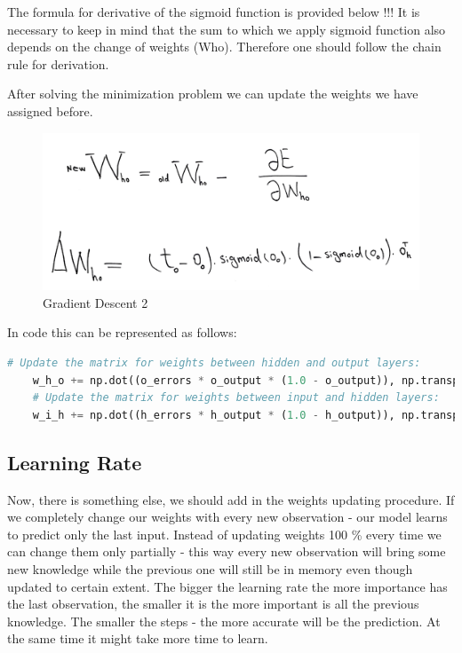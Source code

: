 The formula for derivative of the sigmoid function is provided below !!! It is necessary to keep in mind that the sum to which we apply sigmoid function also depends on the change of weights (Who). Therefore one should follow the chain rule for derivation.

After solving the minimization problem we can update the weights we have assigned before.

\begin{figure}[H]
    \includegraphics[width=\linewidth]{pics/formula5.png}
    \caption{\label{fig:bp} Gradient Descent 2}
\end{figure}

In code this can be represented as follows:

\begin{lstlisting}[language=Python]
    # Update the matrix for weights between hidden and output layers:
    w_h_o += np.dot((o_errors * o_output * (1.0 - o_output)), np.transpose(h_output))
    # Update the matrix for weights between input and hidden layers:
    w_i_h += np.dot((h_errors * h_output * (1.0 - h_output)), np.transpose(input))"
\end{lstlisting}

\subsection{Learning Rate}

Now, there is something else, we should add in the weights updating procedure. If we completely change our weights with every new observation - our model learns to predict only the last input. Instead of updating weights 100 \% every time we can change them only partially - this way every new observation will bring some new knowledge while the previous one will still be in memory even though updated to certain extent. The bigger the learning rate the more importance has the last observation, the smaller it is the more important is all the previous knowledge. The smaller the steps - the more accurate will be the prediction. At the same time it might take more time to learn.

